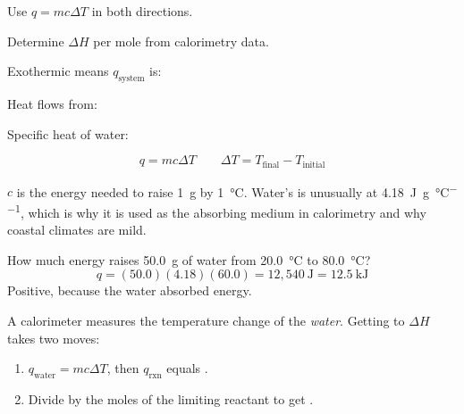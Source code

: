 \documentclass{apchem-notes}
\begin{document}

\begin{objectives}
  \item Use $q = mc\Delta T$ in both directions.
  \item Determine $\Delta H$ per mole from calorimetry data.
\end{objectives}


\begin{warmup}[3]
  \item Exothermic means $q_{\text{system}}$ is:
  \item Heat flows from: 
  \item Specific heat of water: 
\end{warmup}



\[ q = mc\Delta T \qquad \Delta T = T_{\text{final}} - T_{\text{initial}} \]

 $c$ is the energy needed to raise \SI{1}{\gram} by
\SI{1}{\celsius}. Water's is unusually
 at \SI{4.18}{\joule\per\gram\per\celsius}, which is
why it is used as the absorbing medium in calorimetry and why coastal
climates are mild.

\begin{workedexample}
How much energy raises \SI{50.0}{\gram} of water from \SI{20.0}{\celsius}
to \SI{80.0}{\celsius}?
\[ q = (50.0)(4.18)(60.0) = 12{,}540~\text{J} =
   \mathbf{12.5}~\text{kJ} \]
Positive, because the water absorbed energy.
\end{workedexample}



A calorimeter measures the temperature change of the \emph{water}. Getting
to $\Delta H$ takes two moves:

\begin{enumerate}[leftmargin=*,itemsep=0.3em]
  \item $q_{\text{water}} = mc\Delta T$, then $q_{\text{rxn}}$ equals
        .
  \item Divide by the moles of the limiting reactant to get
        \answerblank[3cm]{\si{\kilo\joule\per\mole}}.
\end{enumerate}
\end{document}
